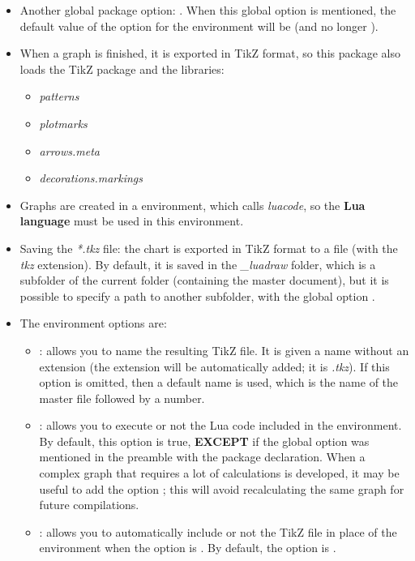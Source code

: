 \begin{itemize}
    \item Another global package option: . When this global option is mentioned, the default value of the  option for the \luadrawenv environment will be \false (and no longer \true).

    \item When a graph is finished, it is exported in TikZ format, so this package also loads the TikZ package and the libraries:

    \begin{itemize}
        \item\emph{patterns}
        \item\emph{plotmarks}
        \item\emph{arrows.meta}
        \item\emph{decorations.markings}
    \end{itemize}
    
    \item Graphs are created in a \luadrawenv environment, which calls \emph{luacode}, so the \textbf{Lua language} must be used in this environment.

    \item Saving the \emph{*.tkz} file: the chart is exported in TikZ format to a file (with the \emph{tkz} extension). By default, it is saved in the \emph{\_luadraw} folder, which is a subfolder of the current folder (containing the master document), but it is possible to specify a path to another subfolder, with the global option .

    \item The environment options are:
    
    \begin{itemize}
        \item {}: allows you to name the resulting TikZ file. It is given a name without an extension (the extension will be automatically added; it is \emph{.tkz}). If this option is omitted, then a default name is used, which is the name of the master file followed by a number.

        \item {}: allows you to execute or not the Lua code included in the environment. By default, this option is true, \textbf{EXCEPT} if the global option  was mentioned in the preamble with the package declaration. When a complex graph that requires a lot of calculations is developed, it may be useful to add the option ; this will avoid recalculating the same graph for future compilations.

        \item {}: allows you to automatically include or not the TikZ file in place of the \luadrawenv environment when the  option is \false. By default, the  option is \true.
    \end{itemize}
\end{itemize}


